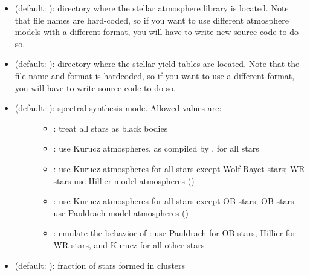\documentclass[letterpaper,10pt,english]{sphinxmanual}
\begin{document}
\begin{itemize}
\item {} 
 (default: ): directory where the stellar atmosphere library is located. Note that file names are hard-coded, so if you want to use different atmosphere models with a different format, you will have to write new source code to do so.

\item {} 
 (default: ): directory where the stellar yield tables are located. Note that the file name and format is hardcoded, so if you want to use a different format, you will have to write source code to do so.

\item {} \begin{description}
\item[{ (default: ): spectral synthesis mode. Allowed values are:}] \leavevmode\begin{itemize}
\item {} 
: treat all stars as black bodies

\item {} 
: use Kurucz atmospheres, as compiled by , for all stars

\item {} 
: use Kurucz atmospheres for all stars except Wolf-Rayet stars; WR stars use Hillier model atmospheres ()

\item {} 
: use Kurucz atmospheres for all stars except OB stars; OB stars use Pauldrach model atmospheres ()

\item {} 
: emulate the behavior of : use Pauldrach for OB stars, Hillier for WR stars, and Kurucz for all other stars

\end{itemize}

\end{description}

\item {} 
 (default: ): fraction of stars formed in clusters


\end{itemize}
\end{document}

